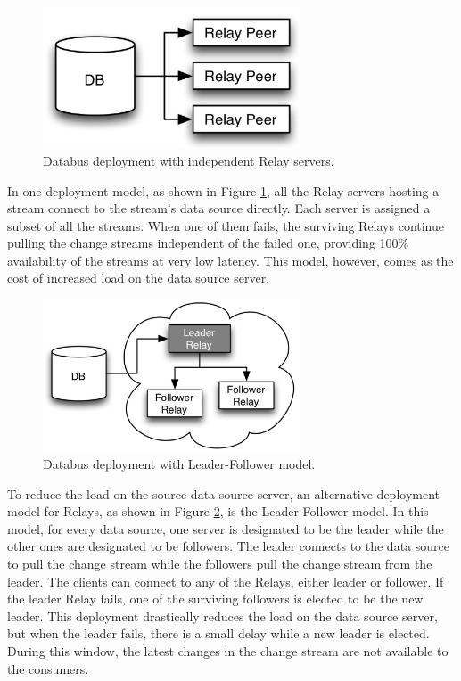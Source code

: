 \documentclass[conference]{IEEEtran}
\begin{document}
\begin{figure}[!htbp]
\centering
\includegraphics[width=3in]{jpeg/relay-direct}
\caption{Databus deployment with independent Relay servers.}
\label{relay-direct}
\end{figure}

In one deployment model, as shown in Figure \ref{relay-direct}, all the Relay servers hosting a stream connect to the stream's data source directly. Each server is assigned a subset of all the streams. When one of them fails, the surviving Relays continue pulling the change
streams independent of the failed one, providing 100\% availability of the streams at very low latency. This model, however, comes as the cost of increased load on the data source server.

\begin{figure}[!htbp]
\centering
\includegraphics[width=3in]{jpeg/relay-leader-follower}
\caption{Databus deployment with Leader-Follower model.}
\label{relay-leader-follower}
\end{figure}

To reduce the load on the source data source server, an alternative deployment model for Relays, as shown in Figure \ref{relay-leader-follower}, is the Leader-Follower model. In this model, for every data source, one server is designated to be the leader while the other ones are designated to be followers. The leader connects to the data source to pull the change stream while the followers pull the change stream from the leader. The clients can connect to any of the Relays, either leader or follower. If the leader Relay fails, one of the surviving followers is elected to be the new leader. This deployment drastically reduces the load on the data source server, but when the leader fails, there is a small delay while a new leader is elected. During this window, the latest changes in the change stream are not available to the consumers.
\end{document}
